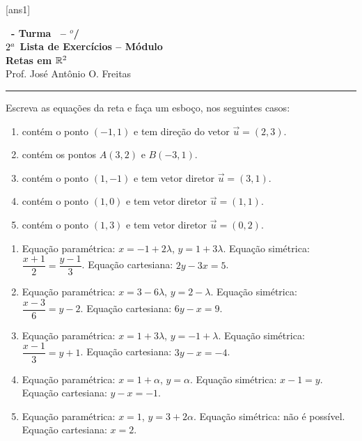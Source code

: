 \documentclass[12pt]{exam}
\begin{document}
[ans1]

\begin{center}
    {\Large\bf \disciplina\ - Turma \turma\ -- \semestre$^{o}$/\ano} \\ \vspace{9pt} {\large\bf
        $2^a$ Lista de Exercícios -- Módulo \numeromodulo\\ Retas em $\mathbb{R}^2$}\\ \vspace{9pt} Prof. José Antônio O. Freitas
\end{center}

\hrule

\vspace{.6cm}

\questao{} Escreva as equações da reta e faça um esboço, nos seguintes casos:
\begin{enumerate}[label=({\alph*})]
    \item contém o ponto $(-1,1)$ e tem direção do vetor $\vec{u} = (2,3)$.
    \item contém os pontos $A(3,2)$ e $B(-3,1)$.
    \item contém o ponto $(1,-1)$ e tem vetor diretor $\vec{u} = (3,1)$.
    \item contém o ponto $(1,0)$ e tem vetor diretor $\vec{u} = (1,1)$.
    \item contém o ponto $(1,3)$ e tem vetor diretor $\vec{u} = (0,2)$.
\end{enumerate}
\begin{solucao}
    \begin{enumerate}[label=({\alph*})]
        \item Equação paramétrica: $x = -1 + 2\lambda$, $y = 1 + 3\lambda$. Equação simétrica: $\dfrac{x + 1}{2} = \dfrac{
                      y - 1}{3}$. Equação cartesiana: $2y - 3x = 5$.
        \item Equação paramétrica: $x = 3 - 6\lambda$, $y = 2 - \lambda$. Equação simétrica: $\dfrac{x - 3}{6} = y - 2$. Equação cartesiana: $6y - x = 9$.
        \item Equação paramétrica: $x = 1 + 3\lambda$, $y = -1 + \lambda$. Equação simétrica: $\dfrac{x - 1}{3} = y + 1$. Equação cartesiana: $3y - x = -4$.
        \item Equação paramétrica: $x = 1 + \alpha$, $y = \alpha$. Equação simétrica: $x - 1 = y$. Equação cartesiana: $y - x = -1$.
        \item Equação paramétrica: $x = 1$, $y = 3 + 2\alpha$. Equação simétrica: não é possível. Equação cartesiana: $x = 2$.
    \end{enumerate}
\end{solucao}
\end{document}
